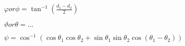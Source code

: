 $\varphi or \phi  = \tan^{-1}{(\frac{d_1-d_2}{2})}$

$\vartheta or \theta = ...$

$\psi = \cos^{-1}{(\cos{\theta_1}\cos{\theta_2} + \sin{\theta_1}\sin{\theta_2}\cos{(\theta_1-\theta_2)})}$






